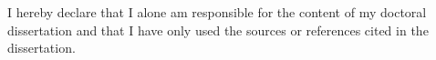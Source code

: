 
\begin{declaration}




I hereby declare that I alone am responsible for the content of my doctoral dissertation and that I have only used the sources or references cited in the dissertation.

\end{declaration}
